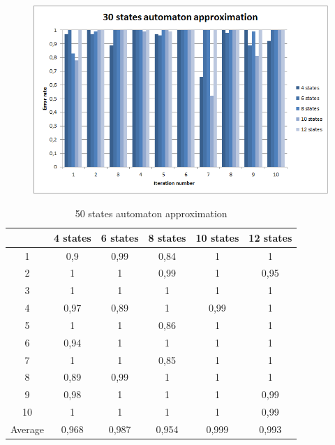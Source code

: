 \documentclass[runningheads,a4paper]{llncs}
\begin{document}
\begin{figure}
\centering
\includegraphics[scale=1]{3.png}
\end{figure}

\begin{table}[]
\centering
\caption{50 states automaton approximation}
\label{my-label}
\begin{tabular}{@{}cccccc@{}}
\toprule
        & 4 states & 6 states & 8 states & 10 states & 12 states    \\ \midrule
1       & 0,9      & 0,99     & 0,84     & 1         & 1 \\
2       & 1        & 1        & 0,99     & 1         & 0,95 \\
3       & 1        & 1        & 1        & 1         & 1 \\
4       & 0,97     & 0,89     & 1        & 0,99      & 1   \\
5       & 1        & 1        & 0,86     & 1         & 1   \\
6       & 0,94     & 1        & 1        & 1         & 1    \\
7       & 1        & 1        & 0,85     & 1         & 1    \\
8       & 0,89     & 0,99     & 1        & 1         & 1     \\
9       & 0,98     & 1        & 1        & 1         & 0,99 \\
10      & 1        & 1        & 1        & 1         & 0,99  \\
Average & 0,968    & 0,987    & 0,954    & 0,999     & 0,993  \\ \bottomrule
\end{tabular}
\end{table}
\end{document}
